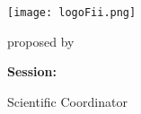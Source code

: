 \begin{titlepage}
    \begin{center}
        \large
        \MakeUppercase{\university}
        
        \LARGE
        \textbf{\MakeUppercase{\faculty}}
        
        \vspace{1cm}
        \texttt{[image: logoFii.png]}
        
        \vspace{1cm}
        \Large
        \MakeUppercase{\thesistype}
        
        \vspace{0.5cm}
        \LARGE
        \textbf{\thesistitle}
        
        \vspace{2cm}
        \Large
        proposed by
        
        \vspace{0.5cm}
        \LARGE
        \textbf{\authornamelf}
        
        \vfill
        \Large
        \textbf{Session:} \session
        
        \vspace{2cm}
        \Large
        Scientific Coordinator
        
        \vspace{0.5cm}
        \LARGE
        \textbf{\coordinator}
    \end{center}
\end{titlepage}